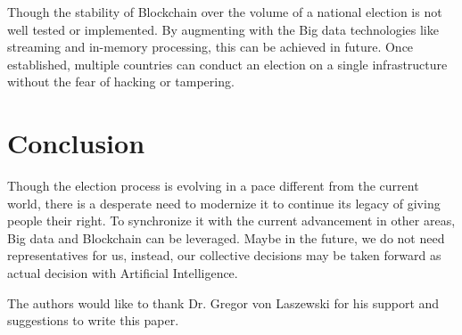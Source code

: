 \documentclass[sigconf]{acmart}
\begin{document}
Though the stability of Blockchain over the volume of a national election is not well tested or implemented. By augmenting with the Big data technologies like streaming and in-memory processing, this can be achieved in future. Once established, multiple countries can conduct an election on a single infrastructure without the fear of hacking or tampering.

\section{Conclusion}
Though the election process is evolving in a pace different from the current world, there is a desperate need to modernize it to continue its legacy of giving people their right. To synchronize it with the current advancement in other areas, Big data and Blockchain can be leveraged.
Maybe in the future, we do not need representatives for us, instead, our collective decisions may be taken forward as actual decision with Artificial Intelligence.

\begin{acks}

  The authors would like to thank Dr. Gregor von Laszewski for his
  support and suggestions to write this paper.
\end{acks}


 


\end{document}
